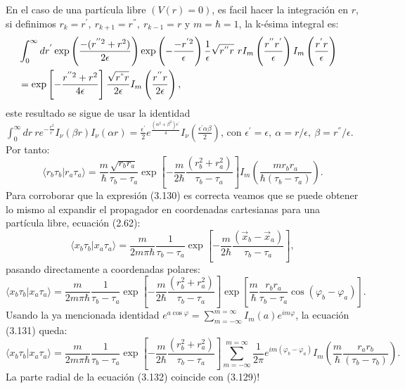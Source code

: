 En el caso de una partícula libre $(V(r)=0)$, es facil hacer la integración en $r$, si definimos $r_k=r^{'},\ r_{k+1}=r^{''},\ r_{k-1}=r$ y $m=\hbar =1$, la k-ésima integral es:
\begin{eqnarray}
\nonumber &\int_{0}^{\infty}dr^{'}\exp\left(\frac{-(r^{''2}+r^{2})}{2\epsilon}\right)\exp\left(-\frac{-r^{'2}}{\epsilon}\right)\frac{1}{\epsilon}\sqrt{r^{''}r}\ rI_{m}\left(\frac{r^{''}r^{'}}{\epsilon}\right)I_{m}\left(\frac{r^{'}r}{\epsilon}\right)&\\
&=  \exp\left[-\frac{r^{''2}+r^{2}}{4\epsilon}\right]\frac{\sqrt{r^{``}r}}{2\epsilon}I_{m}\left(\frac{r^{''}r}{2\epsilon}\right) ,&
\end{eqnarray}
este resultado se sigue de usar la identidad $\int_{0}^{\infty}dr\ re^{-\frac{r^{2}}{\epsilon^{'}}}I_{\nu}(\beta r)I_{\nu}(\alpha r)=\frac{\epsilon^{'}}{2}e^{\frac{(\alpha^{2}+\beta^{2})\epsilon^{'}}{4}}I_{\nu}\left(\frac{\epsilon^{'}\alpha\beta}{2}\right)$, con $\epsilon^{'}=\epsilon ,\ \alpha=r/\epsilon ,\ \beta=r^{''}/\epsilon $. Por tanto:
\begin{equation}
\langle r_{b}\tau_{b}|r_{a}\tau_{a}\rangle =\frac{m}{\hbar}\frac{\sqrt{r_{b}r_{a}}}{\tau_{b}-\tau_{a}}\exp\left[-\frac{m}{2\hbar}\frac{(r_{b}^{2}+r_{a}^{2})}{\tau_{b}-\tau_{a}}\right]I_{m}\left(\frac{mr_{b}r_{a}}{\hbar(\tau_{b}-\tau_{a})}\right) .
\end{equation}
Para corroborar que la expresión (3.130) es correcta veamos que se puede obtener lo mismo al expandir el propagador en coordenadas cartesianas para una partícula libre, ecuación (2.62):
\begin{equation}
\langle x_{b}\tau_{b}|x_{a}\tau_{a}\rangle=\frac{m}{2m\pi\hbar}\frac{1}{\tau_{b}-\tau_{a}}\exp\left[-\frac{m}{2\hbar}\frac{(\vec{x}_{b}-\vec{x}_{a})}{\tau_{b}-\tau_{a}}\right] ,
\end{equation}
pasando directamente a coordenadas polares:
\begin{equation}
\langle x_{b}\tau_{b}|x_{a}\tau_{a}\rangle=\frac{m}{2m\pi\hbar}\frac{1}{\tau_{b}-\tau_{a}}\exp\left[-\frac{m}{2\hbar}\frac{(r_{b}^{2}+r_{a}^{2})}{\tau_{b}-\tau_{a}}\right]\exp\left[\frac{m}{\hbar}\frac{r_{b}r_{a}}{\tau_{b}-\tau_{a}}\cos(\varphi_{b}-\varphi_{a})\right].
\end{equation}
Usando la ya mencionada identidad $e^{a\cos\varphi}=\sum_{m=-\infty}^{m=\infty}I_{m}(a)e^{im\varphi}$, la ecuación (3.131) queda:
\begin{equation}
\langle x_{b}\tau_{b}|x_{a}\tau_{a}\rangle=\frac{m}{2m\pi\hbar}\frac{1}{\tau_{b}-\tau_{a}}\exp\left[-\frac{m}{2\hbar}\frac{(r_{b}^{2}+r_{a}^{2})}{\tau_{b}-\tau_{a}}\right]\sum_{m=-\infty}^{m=\infty}\frac{1}{2\pi}e^{im(\varphi_{b}-\varphi_{a})}I_{m}\left(\frac{m}{\hbar}\frac{r_{a}r_{b}}{(\tau_{b}-\tau_{b})}\right).
\end{equation}
La parte radial de la ecuación (3.132) coincide con (3.129)!
\newpage





